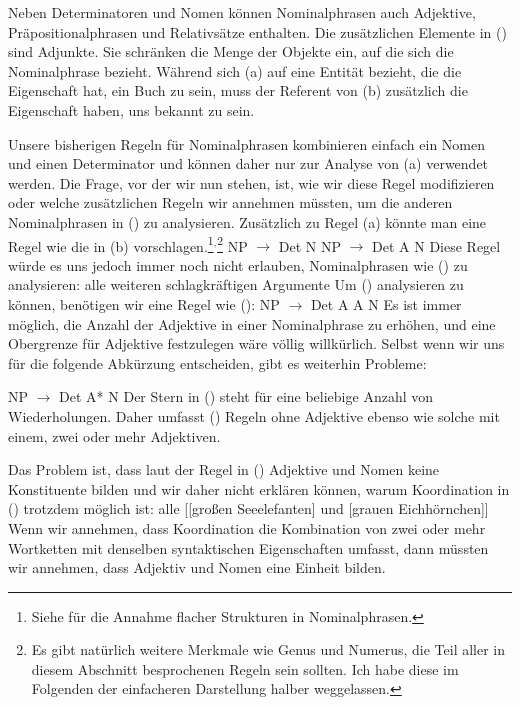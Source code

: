 \noindent
Neben Determinatoren und Nomen können Nominalphrasen auch Adjektive, Präpositionalphrasen und Relativsätze enthalten.
Die zusätzlichen Elemente in () sind Adjunkte. Sie schränken die Menge der Objekte ein, auf die sich die Nominalphrase
bezieht. Während sich (a) auf eine Entität bezieht, die die Eigenschaft hat, ein Buch zu sein, muss der Referent von (b)
zusätzlich die Eigenschaft haben, uns bekannt zu sein.

Unsere bisherigen Regeln für Nominalphrasen kombinieren einfach ein Nomen und einen Determinator und können daher nur zur
Analyse von (a) verwendet werden. Die Frage, vor der wir nun stehen, ist, wie wir diese Regel modifizieren oder welche zusätzlichen Regeln wir
annehmen müssten, um die anderen Nominalphrasen in () zu analysieren. Zusätzlich zu Regel (a) könnte man
eine Regel wie die in (b) vorschlagen.\footnote{%
	Siehe  für die Annahme flacher Strukturen in Nominalphrasen.
}$^,$\footnote{%
	Es gibt natürlich weitere Merkmale wie Genus und Numerus, die Teil aller in diesem Abschnitt
	besprochenen Regeln sein sollten. Ich habe diese im Folgenden der einfacheren Darstellung halber weggelassen.
}
\eal
\ex NP $\to$ Det N
\ex NP $\to$ Det A N
\zl
Diese Regel würde es uns jedoch immer noch nicht erlauben, Nominalphrasen wie () zu analysieren:
\ea
\label{Beispiel-alle-weitern-schlagkraeftigen-Argumente}
alle weiteren schlagkräftigen Argumente
\z
Um () analysieren zu können, benötigen wir eine Regel wie ():
\ea 
NP $\to$ Det A A N
\z
Es ist immer möglich, die Anzahl der Adjektive in einer Nominalphrase zu erhöhen, und eine Obergrenze für
Adjektive festzulegen wäre völlig willkürlich. Selbst wenn wir uns für die folgende Abkürzung entscheiden, gibt es weiterhin Probleme:

\ea
NP $\to$ Det A* N
\z
Der Stern\is{*} in () steht für eine beliebige Anzahl von Wiederholungen. Daher umfasst () Regeln ohne Adjektive
ebenso wie solche mit einem, zwei oder mehr Adjektiven.

Das Problem ist, dass laut der Regel in () Adjektive und Nomen keine Konstituente bilden und wir daher nicht erklären können, warum Koordination
in () trotzdem möglich ist:
\ea
\label{ex-alle-grossen-Seeelefanten-und}
alle [[großen Seeelefanten] und [grauen Eichhörnchen]]
\z
Wenn wir annehmen, dass Koordination die Kombination von zwei oder mehr Wortketten mit denselben syntaktischen Eigenschaften umfasst, dann müssten wir annehmen,
dass Adjektiv und Nomen eine Einheit bilden.

